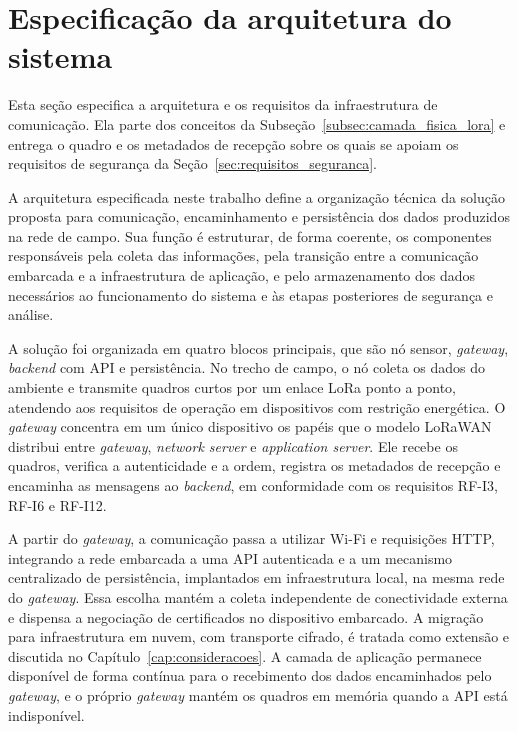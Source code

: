 \section{Especificação da arquitetura do sistema}
\label{sec:requisitos_infra}

Esta seção especifica a arquitetura e os requisitos da infraestrutura de comunicação. Ela parte dos conceitos da Subseção~\ref{subsec:camada_fisica_lora} e entrega o quadro e os metadados de recepção sobre os quais se apoiam os requisitos de segurança da Seção~\ref{sec:requisitos_seguranca}.

A arquitetura especificada neste trabalho define a organização técnica da solução proposta para comunicação, encaminhamento e persistência dos dados produzidos na rede de campo. Sua função é estruturar, de forma coerente, os componentes responsáveis pela coleta das informações, pela transição entre a comunicação embarcada e a infraestrutura de aplicação, e pelo armazenamento dos dados necessários ao funcionamento do sistema e às etapas posteriores de segurança e análise.

A solução foi organizada em quatro blocos principais, que são nó sensor, \textit{gateway}, \textit{backend} com API e persistência. No trecho de campo, o nó coleta os dados do ambiente e transmite quadros curtos por um enlace LoRa ponto a ponto, atendendo aos requisitos de operação em dispositivos com restrição energética. O \textit{gateway} concentra em um único dispositivo os papéis que o modelo LoRaWAN distribui entre \textit{gateway}, \textit{network server} e \textit{application server}. Ele recebe os quadros, verifica a autenticidade e a ordem, registra os metadados de recepção e encaminha as mensagens ao \textit{backend}, em conformidade com os requisitos RF-I3, RF-I6 e RF-I12.

A partir do \textit{gateway}, a comunicação passa a utilizar Wi-Fi e requisições HTTP, integrando a rede embarcada a uma API autenticada e a um mecanismo centralizado de persistência, implantados em infraestrutura local, na mesma rede do \textit{gateway}. Essa escolha mantém a coleta independente de conectividade externa e dispensa a negociação de certificados no dispositivo embarcado. A migração para infraestrutura em nuvem, com transporte cifrado, é tratada como extensão e discutida no Capítulo~\ref{cap:consideracoes}. A camada de aplicação permanece disponível de forma contínua para o recebimento dos dados encaminhados pelo \textit{gateway}, e o próprio \textit{gateway} mantém os quadros em memória quando a API está indisponível.

